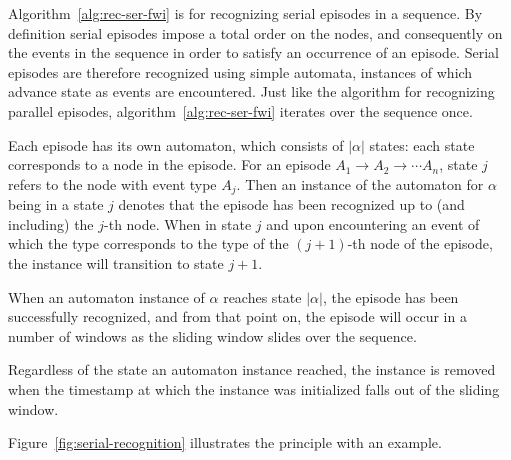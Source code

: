 Algorithm~\ref{alg:rec-ser-fwi} is for recognizing serial episodes in a sequence. By definition serial episodes impose a total order on the nodes, and consequently on the events in the sequence in order to satisfy an occurrence of an episode. Serial episodes are therefore recognized using simple automata, instances of which advance state as events are encountered. Just like the algorithm for recognizing parallel episodes, algorithm~\ref{alg:rec-ser-fwi} iterates over the sequence once.

Each episode has its own automaton, which consists of $ | \alpha | $ states: each state corresponds to a node in the episode. For an episode $ A_1 \to A_2 \to \cdots A_n $, state $ j $ refers to the node with event type $ A_j $. Then an instance of the automaton for $ \alpha $ being in a state $ j $ denotes that the episode has been recognized up to (and including) the $ j $-th node. When in state $ j $ and upon encountering an event of which the type corresponds to the type of the $ (j + 1) $-th node of the episode, the instance will transition to state $ j + 1 $.

When an automaton instance of $ \alpha $ reaches state $ | \alpha | $, the episode has been successfully recognized, and from that point on, the episode will occur in a number of windows as the sliding window slides over the sequence.

Regardless of the state an automaton instance reached, the instance is removed when the timestamp at which the instance was initialized falls out of the sliding window.

Figure~\ref{fig:serial-recognition} illustrates the principle with an example.

